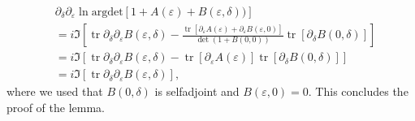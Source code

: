 \documentclass[oneside,reqno,12pt]{amsart}
\DeclareMathOperator{\tr}{tr}
\begin{document}
\begin{align*}
&\partial_{\delta} \partial_{\varepsilon} \ln \text{argdet}\left[ 1 + A(\varepsilon) + B(\varepsilon,\delta))\right] \\
&=i \Im \left[ \tr \partial_{\delta}\partial_{\varepsilon} B(\varepsilon,\delta) - \frac{\tr[\partial_{\varepsilon}A(\varepsilon) + \partial_{\varepsilon} B(\varepsilon,0)]}{\det(1+B(0,0))} \tr[\partial_{\delta} B(0,\delta)]\right]\\
&=i \Im \left[ \tr \partial_{\delta}\partial_{\varepsilon} B(\varepsilon,\delta) - \tr[\partial_{\varepsilon}A(\varepsilon)] \tr[\partial_{\delta} B(0,\delta)]\right]\\
&=i \Im \left[ \tr \partial_{\delta}\partial_{\varepsilon} B(\varepsilon,\delta) \right],
\end{align*}
where we used that \(B(0,\delta)\) is selfadjoint and \(B(\varepsilon,0)=0\). This concludes the proof of the lemma.
\end{document}
